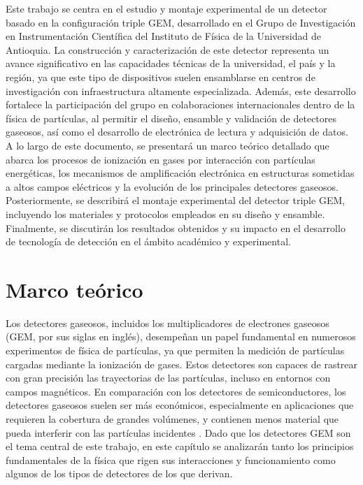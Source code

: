 \documentclass{article}
\begin{document}
\noindent Este trabajo se centra en el estudio y montaje experimental de un detector basado en la configuración triple GEM, desarrollado en el Grupo de Investigación en Instrumentación Científica del Instituto de Física de la Universidad de Antioquia. La construcción y caracterización de este detector representa un avance significativo en las capacidades técnicas de la universidad, el país y la región, ya que este tipo de dispositivos suelen ensamblarse en centros de investigación con infraestructura altamente especializada. Además, este desarrollo fortalece la participación del grupo en colaboraciones internacionales dentro de la física de partículas, al permitir el diseño, ensamble y validación de detectores gaseosos, así como el desarrollo de electrónica de lectura y adquisición de datos.\\

\noindent A lo largo de este documento, se presentará un marco teórico detallado que abarca los procesos de ionización en gases por interacción con partículas energéticas, los mecanismos de amplificación electrónica en estructuras sometidas a altos campos eléctricos y la evolución de los principales detectores gaseosos. Posteriormente, se describirá el montaje experimental del detector triple GEM, incluyendo los materiales y protocolos empleados en su diseño y ensamble. Finalmente, se discutirán los resultados obtenidos y su impacto en el desarrollo de tecnología de detección en el ámbito académico y experimental.\\

\newpage
\section{Marco teórico}

\noindent Los detectores gaseosos, incluidos los multiplicadores de electrones gaseosos (GEM, por sus siglas en inglés), desempeñan un papel fundamental en numerosos experimentos de física de partículas, ya que permiten la medición de partículas cargadas mediante la ionización de gases. Estos detectores son capaces de rastrear con gran precisión las trayectorias de las partículas, incluso en entornos con campos magnéticos. En comparación con los detectores de semiconductores, los detectores gaseosos suelen ser más económicos, especialmente en aplicaciones que requieren la cobertura de grandes volúmenes, y contienen menos material que pueda interferir con las partículas incidentes \cite{sauli2015gaseous}. Dado que los detectores GEM son el tema central de este trabajo, en este capítulo se analizarán tanto los principios fundamentales de la física que rigen sus interacciones y funcionamiento como algunos de los tipos de detectores de los que derivan.\\ 
\end{document}
